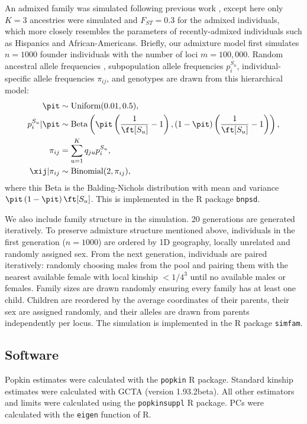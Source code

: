 \documentclass[11pt]{article}
\begin{document}
An admixed family was simulated following previous work \citep{yao_limitations_2022}, except here only $K=3$ ancestries were simulated and $F_{ST}=0.3$ for the admixed individuals, which more closely resembles the parameters of recently-admixed individuals such as Hispanics and African-Americans.
Briefly, our admixture model first simulates $n=1000$ founder individuals with the number of loci $m=100,000$.
Random ancestral allele frequencies \pit, subpopulation allele frequencies $p_i^{S_u}$, individual-specific allele frequencies $\pi_{ij}$, and genotypes \xij are drawn from this hierarchical model:
\begin{align*}
  \pit
  &\sim
    \text{Uniform}( 0.01, 0.5 )
    , \\
  p_i^{S_u} | \pit
  &\sim
    \text{Beta} \left(
    \pit \left( \frac{1}{ \ft[S_u] } - 1 \right),
    \left( 1 - \pit \right) \left( \frac{1}{ \ft[S_u] } - 1 \right)
    \right)
    , \\
  \pi_{ij}
  &=
    \sum_{u = 1}^K q_{ju} p_i^{S_u}
    , \\
  \xij | \pi_{ij}
  &\sim
    \text{Binomial}(2, \pi_{ij})
    ,
\end{align*}
where this Beta is the Balding-Nichols distribution \citep{balding_method_1995} with mean \pit and variance $\pit \left( 1 - \pit \right) \ft[S_u]$.
This is implemented in the R package \texttt{bnpsd}.

We also include family structure in the simulation. 20 generations are generated iteratively. To preserve admixture structure mentioned above, individuals in the first generation ($n=1000$) are ordered by 1D geography, locally unrelated and randomly assigned sex. 
From the next generation, individuals are paired iteratively: randomly choosing males from the pool and pairing them with the nearest available female with local kinship $<1/4^3$ until no available males or females. Family sizes are drawn randomly ensuring every family has at least one child. Children are reordered by the average coordinates of their parents, their sex are assigned randomly, and their alleles are drawn from parents independently per locus. The simulation is implemented in the R package \texttt{simfam}.

\subsection{Software}

Popkin estimates were calculated with the \texttt{popkin} R package.
Standard kinship estimates were calculated with GCTA (version 1.93.2beta).
All other estimators and limits were calculated using the \texttt{popkinsuppl} R package.
PCs were calculated with the \texttt{eigen} function of R.
\end{document}
